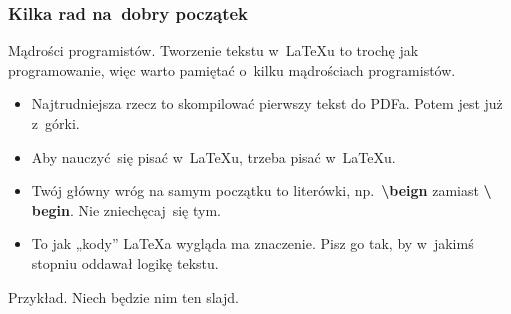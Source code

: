 \documentclass[10pt,t]{beamer}
\begin{document}
\begin{frame}
  \frametitle{Kilka rad na~dobry początek}


  Mądrości programistów.
  Tworzenie tekstu w~\LaTeX u to trochę jak programowanie, więc
  warto pamiętać o~kilku mądrościach programistów.
  \begin{itemize}
    \RaggedRight

  \item Najtrudniejsza rzecz to skompilować pierwszy tekst do
    PDFa. Potem jest już z~górki.

  \item Aby nauczyć~się pisać w~\LaTeX u, trzeba pisać w~\LaTeX u.

  \item Twój główny wróg na samym początku to literówki,
    np.~\textbf{\textbackslash beign} zamiast \textbf{\textbackslash
      begin}. Nie zniechęcaj~się tym.

  \item To jak „kody” \LaTeX a wygląda ma znaczenie. Pisz go
    tak, by w~jakimś stopniu oddawał logikę tekstu.

  \end{itemize}

  Przykład. Niech będzie nim ten slajd.

\end{frame}
\end{document}
